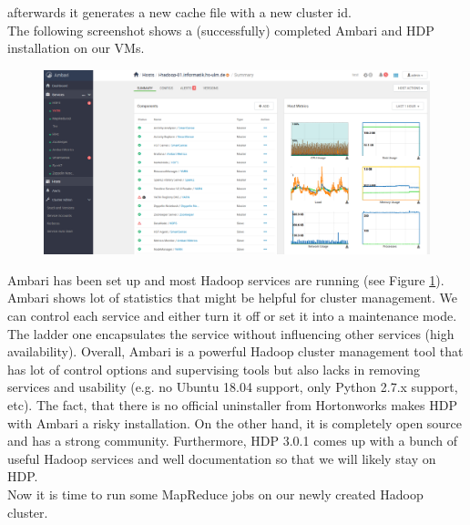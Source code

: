 \documentclass[12pt]{article}
\begin{document}
afterwards it generates a new cache file with a new cluster id.\\
The following screenshot shows a (successfully) completed Ambari and HDP installation on our VMs.
\begin{figure}[H]
\hspace{-3.4cm}
\includegraphics[width=1.5\textwidth]{img/ambari}
\label{pic:ambari}
\end{figure}
\noindent Ambari has been set up and most Hadoop services are running (see Figure \ref{pic:ambari}). Ambari shows lot of statistics that might be helpful for cluster management. We can control each service and either turn it off or set it into a maintenance mode. The ladder one encapsulates the service without influencing other services (high availability). Overall, Ambari is a powerful Hadoop cluster management tool that has lot of control options and supervising tools but also lacks in removing services and usability (e.g. no Ubuntu 18.04 support, only Python 2.7.x support, etc). The fact, that there is no official uninstaller from Hortonworks makes HDP with Ambari a risky installation. On the other hand, it is completely open source and has a strong community. Furthermore, HDP 3.0.1 comes up with a bunch of useful Hadoop services and well documentation so that we will likely stay on HDP.\\ Now it is time to run some MapReduce jobs on our newly created Hadoop cluster. 
\end{document}
